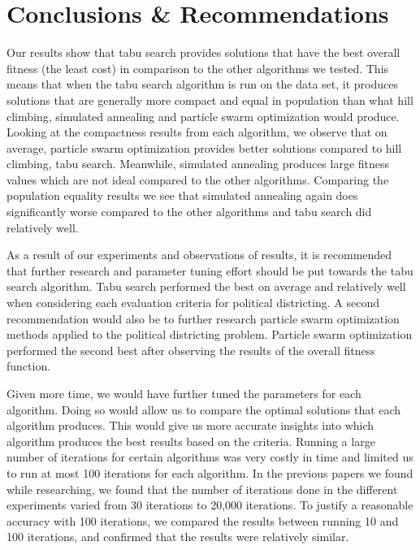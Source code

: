 \documentclass[journal]{IEEEtran}
\begin{document}
\section{Conclusions \& Recommendations}
Our results show that tabu search provides solutions that have the best overall fitness (the least cost) in comparison to the other algorithms we tested. This means that when the tabu search algorithm is run on the data set, it produces solutions that are generally more compact and equal in population than what hill climbing, simulated annealing and particle swarm optimization would produce. Looking at the compactness results from each algorithm, we observe that on average, particle swarm optimization provides better solutions compared to hill climbing, tabu search. Meanwhile, simulated annealing produces large fitness values which are not ideal compared to the other algorithms. Comparing the population equality results we see that simulated annealing again does significantly worse compared to the other algorithms and tabu search did relatively well.

As a result of our experiments and observations of results, it is recommended that further research and parameter tuning effort should be put towards the tabu search algorithm. Tabu search performed the best on average and relatively well when considering each evaluation criteria for political districting. A second recommendation would also be to further research particle swarm optimization methods applied to the political districting problem. Particle swarm optimization performed the second best after observing the results of the overall fitness function.

Given more time, we would have further tuned the parameters for each algorithm. Doing so would allow us to compare the optimal solutions that each algorithm produces. This would give us more accurate insights into which algorithm produces the best results based on the criteria. Running a large number of iterations for certain algorithms was very costly in time and limited us to run at most 100 iterations for each algorithm. In the previous papers we found while researching, we found that the number of iterations done in the different experiments varied from 30 iterations\cite{local-search-2} to 20,000 iterations\cite{geometric-ga}. To justify a reasonable accuracy with 100 iterations, we compared the results between running 10 and 100 iterations, and confirmed that the results were relatively similar. 
\end{document}
